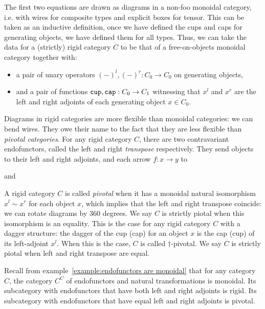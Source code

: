 The first two equations are drawn as diagrams in a non-foo monoidal category, i.e. with wires for composite types and explicit boxes for tensor.
This can be taken as an inductive definition, once we have defined the cups and caps for generating objects, we have defined them for all types.
Thus, we can take the data for a (strictly) rigid category $C$ to be that of a free-on-objects monoidal category together with:
\begin{itemize}
    \item a pair of unary operators $(-)^l, (-)^r : C_0 \to C_0$ on generating objects,
    \item and a pair of functions $\mathtt{cup}, \mathtt{cap} : C_0 \to C_1$ witnessing that $x^l$ and $x^r$ are the left and right adjoints of each generating object $x \in C_0$.
\end{itemize}
Diagrams in rigid categories are more flexible than monoidal categories: we can bend wires.
They owe their name to the fact that they are less flexible than \emph{pivotal categories}.
For any rigid category $C$, there are two contravariant endofunctors, called the left and right \emph{transpose} respectively.
They send objects to their left and right adjoints, and each arrow $f : x \to y$ to
\begin{center}
\hspace{50pt} and \hspace{50pt}
\end{center}
A rigid category $C$ is called \emph{pivotal} when it has a monoidal natural isomorphism $x^l \sim x^r$ for each object $x$, which implies that the left and right transpose coincide: we can rotate diagrams by 360 degrees.
We say $C$ is strictly piotal when this isomorphism is an equality.
This is the case for any rigid category $C$ with a dagger structure: the dagger of the cup (cap) for an object $x$ is the cap (cup) of its left-adjoint $x^l$.
When this is the case, $C$ is called $\dagger$-pivotal.
We say $C$ is strictly piotal when left and right transpose are equal.

\begin{example}
Recall from example~\ref{example:endofunctors are monoidal} that for any category $C$, the category $C^C$ of endofunctors and natural transformations is monoidal.
Its subcategory with endofunctors that have both left and right adjoints is rigid.
Its subcategory with endofunctors that have equal left and right adjoints is pivotal.
\end{example}

